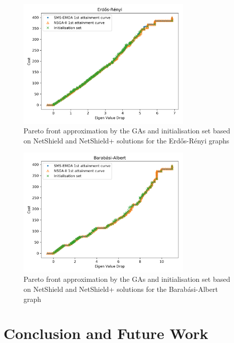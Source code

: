 \documentclass[11pt]{article}
\theoremstyle{definition}
\begin{document}
\begin{figure}[h!]
  \centering
    \includegraphics[width=0.75\textwidth]{results_ns_init/Erdos_Renyi_V100_attainment_nsinit}
  \caption{Pareto front approximation by the GAs and initialisation set based on NetShield and NetShield+ solutions for the Erd\H{o}s-R\'enyi graphs}
  \label{fig:erdos_renyi_atins}
\end{figure}

\begin{figure}[h!]
  \centering
    \includegraphics[width=0.75\textwidth]{results_ns_init/Barabasi_Albert_V100_attainment_nsinit}
  \caption{Pareto front approximation by the GAs and initialisation set based on NetShield and NetShield+ solutions for the Barab\'asi-Albert graph}
  \label{fig:baral_atins}
\end{figure}


\cleardoublepage


\section{Conclusion and Future Work}
\end{document}
